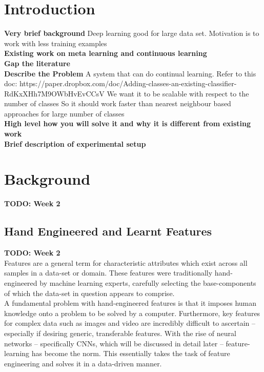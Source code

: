 \documentclass{report}
\title{}
\author{Ash}
\begin{document}
	
	\maketitle
	\thispagestyle{empty}
	\newpage
	\thispagestyle{empty}
	\tableofcontents
	\newpage
	\thispagestyle{empty}
	\listoffigures
	\newpage
	
	\chapter{Introduction}
	\textbf{Very brief background}
	Deep learning good for large data set.
	Motivation is to work with less training examples \\
	\textbf{Existing work on meta learning and continuous learning} \\
	\textbf{Gap the literature} \\
	\textbf{Describe the Problem}
	A system that can do continual learning. Refer to this doc:
	https://paper.dropbox.com/doc/Adding-classes-an-existing-classifier-RdKxXHh7M9OWbHvEvCCsV
	We want it to be scalable with respect to the number of classes
	So it should work faster than nearest neighbour based approaches for large number of classes \\
	\textbf{High level how you will solve it and why it is different from existing work} \\
	\textbf{Brief description of experimental setup} \\
	
	
	\chapter{Background}
	\textbf{TODO: Week 2} \\
	\section{Hand Engineered and Learnt Features}
	\textbf{TODO: Week 2} \\
	Features are a general term for characteristic attributes which exist across all samples in a data-set or domain. These features were traditionally hand-engineered by machine learning experts, carefully selecting the base-components of which the data-set in question appears to comprise. \\
	A fundamental problem with hand-engineered features is that it imposes human knowledge onto a problem to be solved by a computer. Furthermore, key features for complex data such as images and video are incredibly difficult to ascertain -- especially if desiring generic, transferable features. With the rise of neural networks -- specifically CNNs, which will be discussed in detail later -- feature-learning has become the norm. This essentially takes the task of feature engineering and solves it in a data-driven manner.
\end{document}
